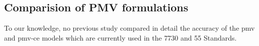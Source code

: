 %
%
%

\subsection{Comparision of PMV formulations}\label{subsec:comparision-of-pmv-formulations}
To our knowledge, no previous study compared in detail the accuracy of the \ac{pmv} and \ac{pmv-ce} models which are currently used in the \gls{7730} and \gls{55} Standards.


